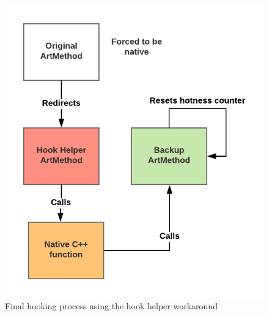 \begin{figure}[H]
	\begin{center}
		\includegraphics[scale=0.45]{figures/HookProcess.png}
	\end{center}
	\caption{Final hooking process using the hook helper workaround}
	\label{HookProcess}
\end{figure}



